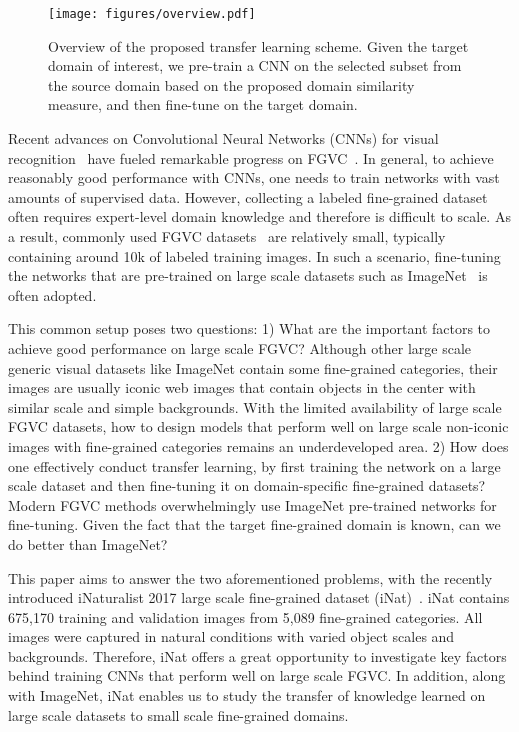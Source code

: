 \documentclass[10pt,twocolumn,letterpaper]{article}
\begin{document}
\begin{figure}[t]
\begin{center}
\texttt{[image: figures/overview.pdf]}
\end{center}
\caption{Overview of the proposed transfer learning scheme.
Given the target domain of interest, we pre-train a CNN on the selected subset from the source domain based on the proposed domain similarity measure, and then fine-tune on the target domain.}
\label{fig:overview}
\end{figure}

Recent advances on Convolutional Neural Networks (CNNs) for visual recognition~\cite{alexnet, vggnet, googlenet, resnet} have fueled remarkable progress on FGVC~\cite{bilinearcnn, kernel_pooling, multi-attention_fgvc}.
In general, to achieve reasonably good performance with CNNs, one needs to train networks with vast amounts of supervised data.
However, collecting a labeled fine-grained dataset often requires expert-level domain knowledge and therefore is difficult to scale.
As a result, commonly used FGVC datasets~\cite{cub200, stanford_dog, stanford_car} are relatively small, typically containing around 10k of labeled training images.
In such a scenario, fine-tuning the networks that are pre-trained on large scale datasets such as ImageNet~\cite{imagenet} is often adopted. 

This common setup poses two questions:
1) What are the important factors to achieve good performance on large scale FGVC? 
Although other large scale generic visual datasets like ImageNet contain some fine-grained categories, their images are usually iconic web images that contain objects in the center with similar scale and simple backgrounds.
With the limited availability of large scale FGVC datasets, how to design models that perform well on large scale non-iconic images with fine-grained categories remains an underdeveloped area.
2) How does one effectively conduct transfer learning, by first training the network on a large scale dataset and then fine-tuning it on domain-specific fine-grained datasets?
Modern FGVC methods overwhelmingly use ImageNet pre-trained networks for fine-tuning.
Given the fact that the target fine-grained domain is known, can we do better than ImageNet?

This paper aims to answer the two aforementioned problems, with the recently introduced iNaturalist 2017 large scale fine-grained dataset (iNat)~\cite{inaturalist}.
iNat contains 675,170 training and validation images from 5,089 fine-grained categories. All images were captured in natural conditions with varied object scales and backgrounds.
Therefore, iNat offers a great opportunity to investigate key factors behind training CNNs that perform well on large scale FGVC. 
In addition, along with ImageNet, iNat enables us to study the transfer of knowledge learned on large scale datasets to small scale fine-grained domains.
\end{document}
